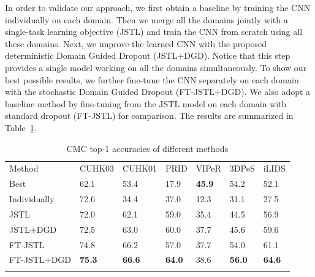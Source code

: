 In order to validate our approach, we first obtain a baseline by training the CNN individually on each domain. Then we merge all the domains jointly with a single-task learning objective (JSTL) and train the CNN from scratch using all these domains. Next, we improve the learned CNN with the proposed deterministic Domain Guided Dropout (JSTL+DGD). Notice that this step provides a single model working on all the domains simultaneously. To show our best possible results, we further fine-tune the CNN separately on each domain with the stochastic Domain Guided Dropout (FT-JSTL+DGD). We also adopt a baseline method by fine-tuning from the JSTL model on each domain with standard dropout (FT-JSTL) for comparison. The results are summarized in Table~\ref{tab:md-comparison-with-sota}.

\begin{table}[t]
\begin{center}
\begin{tabular}{lllllll}
\hline\noalign{\smallskip}
\noalign{\smallskip}
Method & CUHK03 & CUHK01 & PRID & VIPeR & 3DPeS & iLIDS\\
\noalign{\smallskip}\hline\hline\noalign{\smallskip}
Best & 62.1~\cite{paisitkriangkrai2015learning} & 53.4~\cite{paisitkriangkrai2015learning} & 17.9~\cite{paisitkriangkrai2015learning} & \textbf{45.9}~\cite{paisitkriangkrai2015learning} & 54.2~\cite{xiong2014person} & 52.1~\cite{ding2015deep} \\
Individually & 72.6 & 34.4 & 37.0 & 12.3 & 31.1 & 27.5 \\
JSTL & 72.0 & 62.1 & 59.0 & 35.4 & 44.5 & 56.9 \\
JSTL+DGD & 72.5 & 63.0 & 60.0 & 37.7 & 45.6 & 59.6 \\
FT-JSTL & 74.8 & 66.2 & 57.0 & 37.7 & 54.0 & 61.1 \\
FT-JSTL+DGD & \textbf{75.3} & \textbf{66.6} & \textbf{64.0} & 38.6 & \textbf{56.0} & \textbf{64.6} \\
\hline\noalign{\smallskip}
\end{tabular}
\end{center}
\caption{CMC top-1 accuracies of different methods}
\label{tab:md-comparison-with-sota}
\end{table}

